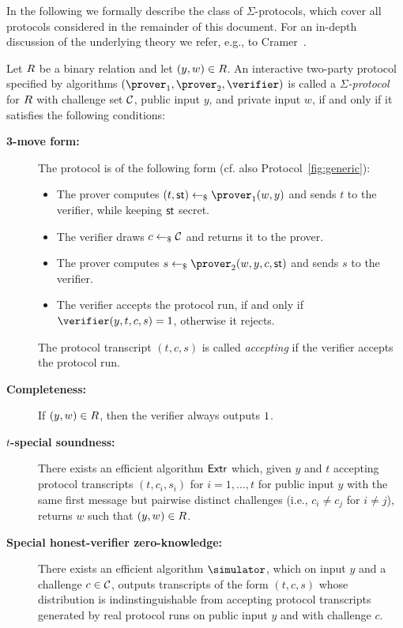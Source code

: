 \documentclass[runningheads]{llncs}
\begin{document}
In the following we formally describe the class of $\Sigma$-protocols, which cover all protocols considered in the remainder of this document.
 For an in-depth discussion of the underlying theory we refer, e.g., to Cramer~\cite{cramer97}.
\begin{definition}\label{def:sigma}
  Let $R$ be a binary relation and let $(y,w)\in R$.
  An interactive two-party protocol specified by algorithms $(\prover_1,\prover_2,\verifier)$ is called a \emph{$\Sigma$-protocol} for $R$ with challenge set $\mathcal{C}$, public input $y$, and private input $w$, if and only if it satisfies the following conditions:
  \begin{description}
    \item[\bf 3-move form:]
      The protocol is of the following form (cf. also Protocol~\ref{fig:generic}):
      \begin{itemize}
        \item
          The prover computes $(t,\st) \getsr \prover_1(w,y)$ and sends $t$ to the verifier, while keeping $\mathsf{st}$ secret.
        \item
          The verifier draws $c\gets_{\$}\mathcal{C}$ and returns it to the prover.
        \item
          The prover computes $s\getsr\prover_2(w,y,c,\st)$ and sends $s$ to the verifier.
        \item
          The verifier accepts the protocol run, if and only if $\verifier(y,t,c,s)=\accept$, otherwise it rejects.
      \end{itemize}
      The protocol transcript $(t,c,s)$ is called \emph{accepting} if the verifier accepts the protocol run.
    \item[\bf Completeness:]
      If $(y,w)\in R$, then the verifier always outputs $1$.
    \item[\bf $t$-special soundness:]
      There exists an efficient algorithm $\mathsf{Extr}$ which, given $y$ and $t$ accepting protocol transcripts $(t,c_i,s_i)$ for $i=1,\dots,t$ for public input $y$ with the same first message but pairwise distinct challenges (i.e., $c_i\ne c_j$ for $i\ne j$), returns $w$ such that $(y,w)\in R$.
    \item[\bf Special honest-verifier zero-knowledge:]
      There exists an efficient algorithm $\simulator$, which on input $y$ and a challenge $c\in\mathcal{C}$, outputs transcripts of the form $(t,c,s)$ whose distribution is indinstinguishable from accepting protocol transcripts generated by real protocol runs on public input $y$ and with challenge $c$.

\end{description}
\end{definition}
\end{document}
